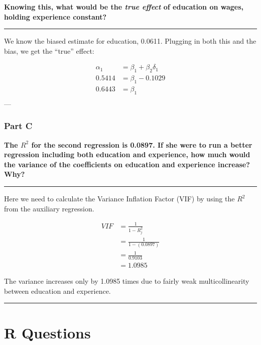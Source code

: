\documentclass[
]{article}
\begin{document}
\textbf{Knowing this, what would be the \emph{true effect} of education
on wages, holding experience constant?}

\begin{center}\rule{0.5\linewidth}{0.5pt}\end{center}

We know the biased estimate for education, 0.0611. Plugging in both this
and the bias, we get the ``true'' effect:

\[\begin{align*}
            \alpha_1&=\beta_1+\beta_2\delta_1\\
            0.5414&=\beta_1-0.1029\\
            0.6443&=\beta_1\\
\end{align*}\] ---

\hypertarget{part-c-1}{%
\subsubsection{Part C}\label{part-c-1}}

\textbf{The \(R^2\) for the second regression is 0.0897. If she were to
run a better regression including both education and experience, how
much would the variance of the coefficients on education and experience
increase? Why?}

\begin{center}\rule{0.5\linewidth}{0.5pt}\end{center}

Here we need to calculate the Variance Inflation Factor (VIF) by using
the \(R^2\) from the auxiliary regression.

\[\begin{align*}
        VIF &=\frac{1}{1-R^2_j}\\
        &=\frac{1}{1-(0.0897)}\\
        &=\frac{1}{0.9103}\\
        &=1.0985
\end{align*}\]

The variance increases only by 1.0985 times due to fairly weak
multicollinearity between education and experience.

\begin{center}\rule{0.5\linewidth}{0.5pt}\end{center}

\hypertarget{r-questions}{%
\section{R Questions}\label{r-questions}}
\end{document}
